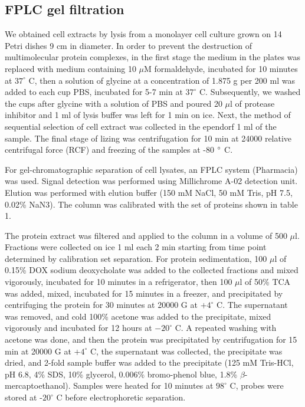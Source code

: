 \documentclass[alpha-refs]{wiley-article}
\begin{document}
\subsection{FPLC gel filtration}

We obtained cell extracts by lysis from a monolayer cell culture grown on 14 Petri dishes 9 cm in diameter.
In order to prevent the destruction of multimolecular protein complexes, in the first stage the medium in the plates was replaced with medium containing 10 $\mu$M formaldehyde, incubated for 10 minutes at $37^{\circ}$ C, then a solution of glycine at a concentration of 1.875 g per 200 ml was added to each cup PBS, incubated for 5-7 min at  $37^{\circ}$  C. Subsequently, we washed the cups after glycine with a solution of PBS and poured 20 $\mu$l of protease inhibitor and 1 ml of lysis buffer was left for 1 min on ice.
Next, the method of sequential selection of cell extract was collected in the ependorf 1 ml of the sample. The final stage of lizing was centrifugation for 10 min at 24000 relative centrifugal force (RCF) and freezing of the samples at -80 $\degree$  C.


For gel-chromatographic separation of cell lysates, an FPLC system (Pharmacia) was used.
Signal detection was performed using Millichrome A-02 detection unit.
Elution was performed with elution buffer (150 mM NaCl, 50 mM Tris, pH 7.5, 0.02\% NaN3).
The column was calibrated with the set of proteins shown in table 1.


The protein extract was filtered and applied to the column in a volume of 500 $\mu$l.
Fractions were collected on ice 1 ml each 2 min starting from time point determined by calibration set separation.
For protein sedimentation, 100 $\mu$l of 0.15\% DOX sodium deoxycholate was added to the collected fractions and mixed vigorously, incubated for 10 minutes in a refrigerator, then 100 $\mu$l of 50\% TCA was added, mixed, incubated for 15 minutes in a freezer, and precipitated by centrifuging the protein for 30 minutes at 20000 G at $+4^{\circ}$ C.
The supernatant was removed, and cold 100\% acetone was added to the precipitate, mixed vigorously and incubated for 12 hours at $-20^{\circ}$ C.
A repeated washing with acetone was done, and then the protein was precipitated by centrifugation for 15 min at 20000 G at $+4^{\circ}$ C, the supernatant was collected, the precipitate was dried, and 2-fold sample buffer was added to the precipitate (125 mM Tris-HCl, pH 6.8, 4\% SDS, 10\% glycerol, 0.006\% bromo-phenol blue, 1.8\% $\beta$-mercaptoethanol).
Samples were heated for 10 minutes at $98^{\circ}$ C, probes were stored at -$20^{\circ}$ C before electrophoretic separation.
\end{document}
